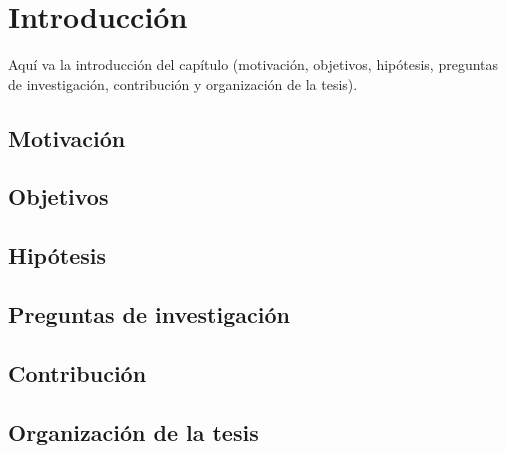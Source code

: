 \chapter{Introducción}\label{cap:intro}

Aquí va la introducción del capítulo (motivación, objetivos, hipótesis,
preguntas de investigación, contribución y organización de la tesis).

\section{Motivación}\label{sec:intro-motivacion}

\section{Objetivos}\label{sec:intro-objetivos}

\section{Hipótesis}\label{sec:intro-hipotesis}

\section{Preguntas de investigación}\label{sec:intro-preguntas}

\section{Contribución}\label{sec:intro-contribucion}

\section{Organización de la tesis}\label{sec:intro-organizacion}
